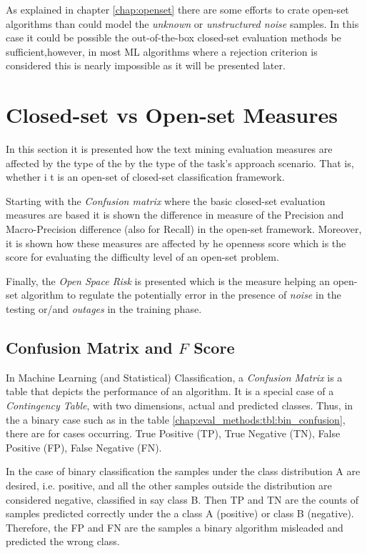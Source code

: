 As explained in chapter \ref{chap:openset} there are some efforts to crate open-set algorithms than could model the \textit{unknown} or \textit{unstructured noise} samples. In this case it could be possible the out-of-the-box closed-set evaluation methods be sufficient,however, in most ML algorithms where a rejection criterion is considered this is nearly impossible as it will be presented later.

\section{Closed-set vs Open-set Measures}\label{chap:eval_methods:sec:measures} 

In this section it is presented how the text mining evaluation measures are affected by the type of the by the type of the task's approach scenario. That is, whether i
t is an open-set of closed-set classification framework.

Starting with the \textit{Confusion matrix} where the basic closed-set evaluation measures are based it is shown the difference in measure of the Precision and Macro-Precision difference (also for Recall) in the open-set framework. Moreover, it is shown how these measures are affected by he openness score which is the score for evaluating the difficulty level of an open-set problem.

Finally, the \textit{Open Space Risk} is presented which is the measure helping an open-set algorithm to regulate the potentially error in the presence of \textit{noise} in the testing or/and \textit{outages} in the training phase.


\subsection{Confusion Matrix and $F$ Score}\label{chap:eval_methods:sec:prf_micro}

In Machine Learning (and Statistical) Classification, a \textit{Confusion Matrix} is a table that depicts the performance of an algorithm. It is a special case of a \textit{Contingency Table}, with two dimensions, actual and predicted classes. Thus, in the a binary case such as in the table \ref{chap:eval_methods:tbl:bin_confusion}, there are for cases occurring. True Positive (TP), True Negative (TN), False Positive (FP), False Negative (FN).

In the case of binary classification the samples under the class distribution A are desired, i.e. positive, and all the other samples outside the distribution are considered negative, classified in say class B. Then TP and TN are the counts of samples predicted correctly under the a class A (positive) or class B (negative). Therefore, the FP and FN are the samples a binary algorithm misleaded and predicted the wrong class. 

